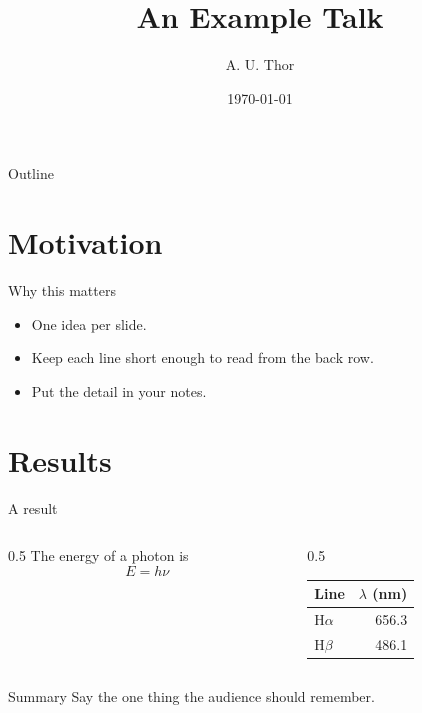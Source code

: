 \documentclass[aspectratio=169,11pt]{beamer}
\title{An Example Talk}
\author{A. U. Thor}
\institute{Your Institution}
\date{\today}
\begin{document}
\begin{frame}
  \titlepage
\end{frame}

\begin{frame}{Outline}
  \tableofcontents
\end{frame}

\section{Motivation}

\begin{frame}{Why this matters}
  \begin{itemize}
    \item One idea per slide.
    \item Keep each line short enough to read from the back row.
    \item Put the detail in your notes.
  \end{itemize}
\end{frame}

\section{Results}

\begin{frame}{A result}
  \begin{columns}
    \begin{column}{0.5\textwidth}
      The energy of a photon is
      \[ E = h\nu \]
    \end{column}
    \begin{column}{0.5\textwidth}
      \begin{tabular}{lr}
        \toprule
        Line & $\lambda$ (nm) \\
        \midrule
        H$\alpha$ & 656.3 \\
        H$\beta$ & 486.1 \\
        \bottomrule
      \end{tabular}
    \end{column}
  \end{columns}
\end{frame}

\begin{frame}{Summary}
  Say the one thing the audience should remember.
\end{frame}
\end{document}
